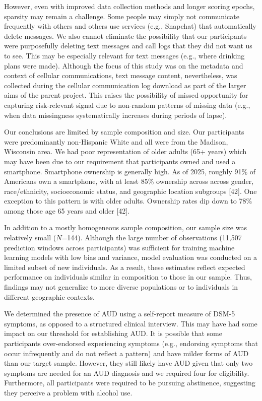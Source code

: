 \documentclass[
  letterpaper,
  DIV=11,
  numbers=noendperiod]{scrartcl}
\begin{document}
However, even with improved data collection methods and longer scoring
epochs, sparsity may remain a challenge. Some people may simply not
communicate frequently with others and others use services (e.g.,
Snapchat) that automatically delete messages. We also cannot eliminate
the possibility that our participants were purposefully deleting text
messages and call logs that they did not want us to see. This may be
especially relevant for text messages (e.g., where drinking plans were
made). Although the focus of this study was on the metadata and context
of cellular communications, text message content, nevertheless, was
collected during the cellular communication log download as part of the
larger aims of the parent project. This raises the possibility of missed
opportunity for capturing risk-relevant signal due to non-random
patterns of missing data (e.g., when data missingness systematically
increases during periods of lapse).

Our conclusions are limited by sample composition and size. Our
participants were predominantly non-Hispanic White and all were from the
Madison, Wisconsin area. We had poor representation of older adults (65+
years) which may have been due to our requirement that participants
owned and used a smartphone. Smartphone ownership is generally high. As
of 2025, roughly 91\% of Americans own a smartphone, with at least 85\%
ownership across across gender, race/ethnicity, socioeconomic status,
and geographic location subgroups {[}42{]}. One exception to this
pattern is with older adults. Ownership rates dip down to 78\% among
those age 65 years and older {[}42{]}.

In addition to a mostly homogeneous sample composition, our sample size
was relatively small (\(N\)=144). Although the large number of
observations (11,507 prediction windows across participants) was
sufficient for training machine learning models with low bias and
variance, model evaluation was conducted on a limited subset of new
individuals. As a result, these estimates reflect expected performance
on individuals similar in composition to those in our sample. Thus,
findings may not generalize to more diverse populations or to
individuals in different geographic contexts.

We determined the presence of AUD using a self-report measure of DSM-5
symptoms, as opposed to a structured clinical interview. This may have
had some impact on our threshold for establishing AUD. It is possible
that some participants over-endorsed experiencing symptoms (e.g.,
endorsing symptoms that occur infrequently and do not reflect a pattern)
and have milder forms of AUD than our target sample. However, they still
likely have AUD given that only two symptoms are needed for an AUD
diagnosis and we required four for eligibility. Furthermore, all
participants were required to be pursuing abstinence, suggesting they
perceive a problem with alcohol use.
\end{document}
